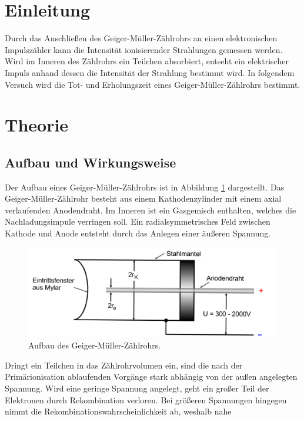 
\section{Einleitung}
Durch das Anschließen des Geiger-Müller-Zählrohrs an einen elektronischen Impulszähler
kann die Intensität ionisierender Strahlungen gemessen werden. Wird im Inneren des Zählrohrs
ein Teilchen absorbiert, entseht ein elektrischer Impuls anhand dessen die Intensität der Strahlung
bestimmt wird.
\newline
In folgendem Versuch wird die Tot- und Erholungszeit eines Geiger-Müller-Zählrohrs bestimmt.

\section{Theorie}
\subsection{Aufbau und Wirkungsweise}
Der Aufbau eines Geiger-Müller-Zählrohrs ist in Abbildung \ref{fig:Geiger} dargestellt.
Das Geiger-Müller-Zählrohr besteht aus einem Kathodenzylinder mit einem axial verlaufenden Anodendraht.
Im Inneren ist ein Gasgemisch enthalten, welches die Nachladungsimpule verringen soll.
Ein radialsymmetrisches Feld zwischen Kathode und Anode entsteht durch das Anlegen einer äußeren Spannung.
\newline
\begin{figure}
  \centering
  \includegraphics[scale=0.45]{zählrohr.png}
  \caption{Aufbau des Geiger-Müller-Zählrohrs.\cite{anleitung}}
  \label{fig:Geiger}
\end{figure}
\newline
Dringt ein Teilchen in das Zählrohrvolumen ein, sind die nach der Primärionisation ablaufenden
Vorgänge stark abhängig von der außen angelegten Spannung.
Wird eine geringe Spannung angelegt, geht ein großer Teil der Elektronen durch Rekombination
verloren. Bei größeren Spannungen hingegen nimmt die Rekombinationswahrscheinlichkeit ab, weshalb nahe
